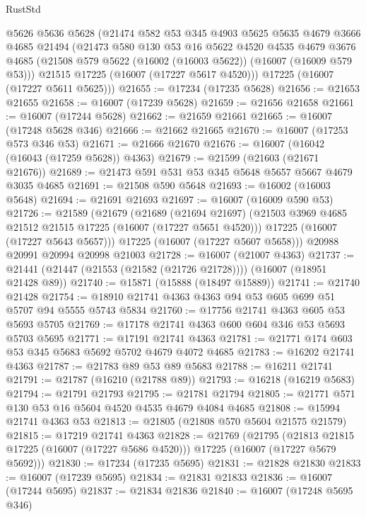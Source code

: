 \begin{lexlean}{RustStd}
\begin{coremodule}
    @5626
    @5636
    @5628
    (@21474
      @582
      @53
      @345
      @4903
      @5625
      @5635
      @4679
      @3666
      @4685
      @21494
      (@21473
        @580
        @130
        @53
        @16
        @5622
        @4520
        @4535
        @4679
        @3676
        @4685
        (@21508 @579 @5622 (@16002 (@16003 @5622)) (@16007 (@16009 @579 @53)))
        @21515
        @17225
        (@16007 (@17227 @5617 @4520)))
      @17225
      (@16007 (@17227 @5611 @5625)))
@21655 := @17234 (@17235 @5628)
@21656 := @21653 @21655
@21658 := @16007 (@17239 @5628)
@21659 := @21656 @21658
@21661 := @16007 (@17244 @5628)
@21662 := @21659 @21661
@21665 := @16007 (@17248 @5628 @346)
@21666 := @21662 @21665
@21670 := @16007 (@17253 @573 @346 @53)
@21671 := @21666 @21670
@21676 := @16007 (@16042 (@16043 (@17259 @5628)) @4363)
@21679 := @21599 (@21603 (@21671 @21676))
@21689 := @21473 @591 @531 @53 @345 @5648 @5657 @5667 @4679 @3035 @4685
@21691 := @21508 @590 @5648
@21693 := @16002 (@16003 @5648)
@21694 := @21691 @21693
@21697 := @16007 (@16009 @590 @53)
@21726 := @21589
    (@21679
      (@21689
        (@21694 @21697)
        (@21503 @3969 @4685 @21512 @21515 @17225 (@16007 (@17227 @5651 @4520)))
        @17225
        (@16007 (@17227 @5643 @5657)))
      @17225
      (@16007 (@17227 @5607 @5658)))
    @20988
    @20991
    @20994
    @20998
    @21003
@21728 := @16007 (@21007 @4363)
@21737 := @21441 (@21447 (@21553 (@21582 (@21726 @21728)))) (@16007 (@18951 @21428 @89))
@21740 := @15871 (@15888 (@18497 @15889))
@21741 := @21740 @21428
@21754 := @18910 @21741 @4363 @4363 @94 @53 @605 @699 @51 @5707 @94 @5555 @5743 @5834
@21760 := @17756 @21741 @4363 @605 @53 @5693 @5705
@21769 := @17178 @21741 @4363 @600 @604 @346 @53 @5693 @5703 @5695
@21771 := @17191 @21741 @4363
@21781 := @21771 @174 @603 @53 @345 @5683 @5692 @5702 @4679 @4072 @4685
@21783 := @16202 @21741 @4363
@21787 := @21783 @89 @53 @89 @5683
@21788 := @16211 @21741
@21791 := @21787 (@16210 (@21788 @89))
@21793 := @16218 (@16219 @5683)
@21794 := @21791 @21793
@21795 := @21781 @21794
@21805 := @21771 @571 @130 @53 @16 @5604 @4520 @4535 @4679 @4084 @4685
@21808 := @15994 @21741 @4363 @53
@21813 := @21805 (@21808 @570 @5604 @21575 @21579)
@21815 := @17219 @21741 @4363
@21828 := @21769
    (@21795
      (@21813 @21815 @17225 (@16007 (@17227 @5686 @4520)))
      @17225
      (@16007 (@17227 @5679 @5692)))
@21830 := @17234 (@17235 @5695)
@21831 := @21828 @21830
@21833 := @16007 (@17239 @5695)
@21834 := @21831 @21833
@21836 := @16007 (@17244 @5695)
@21837 := @21834 @21836
@21840 := @16007 (@17248 @5695 @346)

\end{coremodule}
\end{lexlean}
